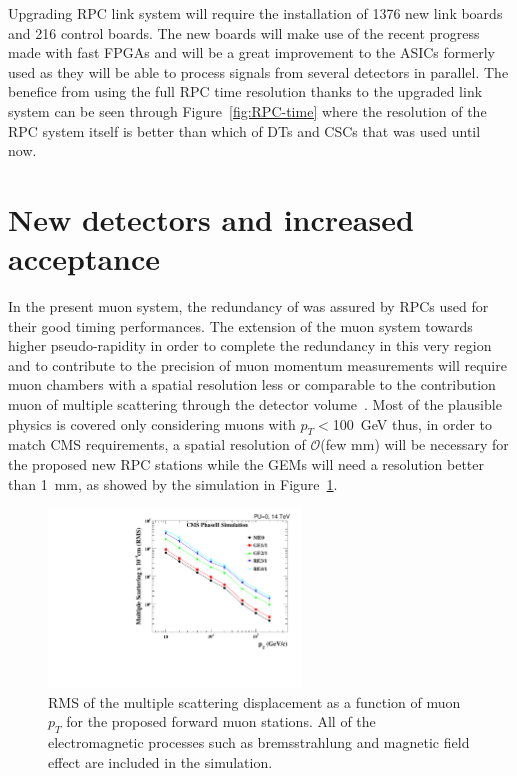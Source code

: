 	Upgrading RPC link system will require the installation of 1376 new link boards and 216 control boards. The new boards will make use of the recent progress made with fast FPGAs and will be a great improvement to the ASICs formerly used as they will be able to process signals from several detectors in parallel. The benefice from using the full RPC time resolution thanks to the upgraded link system can be seen through Figure~\ref{fig:RPC-time} where the resolution of the RPC system itself is better than which of DTs and CSCs that was used until now.

\section{New detectors and increased acceptance}
\label{chapt3:sec:GEMRPC}

	In the present muon system, the redundancy of was assured by RPCs used for their good timing performances. The extension of the muon system towards higher pseudo-rapidity in order to complete the redundancy in this very region and to contribute to the precision of muon momentum measurements will require muon chambers with a spatial resolution less or comparable to the contribution  muon of multiple scattering through the detector volume~\cite{MUONTDR}. Most of the plausible physics is covered only considering muons with $p_T<$\SI{100}{GeV} thus, in order to match CMS requirements, a spatial resolution of $\mathcal{O}$(few $\mathrm{mm}$) will be necessary for the proposed new RPC stations while the GEMs will need a resolution better than \SI{1}{mm}, as showed by the simulation in Figure~\ref{fig:MultiScat}.

	\begin{figure}[H]
		\centering
		\includegraphics[width=0.6\textwidth]{fig/chapt3/MS_allstations.pdf}
		\caption{\label{fig:MultiScat} RMS of the multiple scattering displacement as a function of muon $p_T$ for the proposed forward muon stations. All of the electromagnetic processes such as bremsstrahlung and magnetic field effect are included in the simulation.}
	\end{figure}
	

